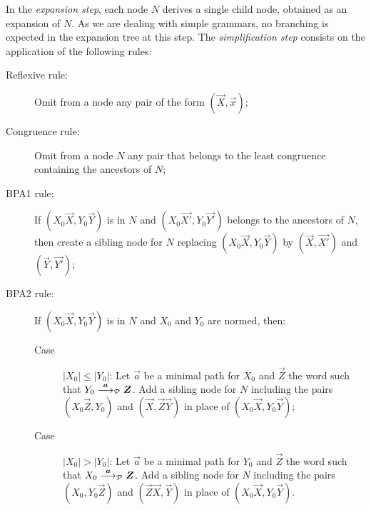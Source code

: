 In the \emph{expansion step}, each node $N$ derives a single child
node, obtained as an expansion of $N$. As we are dealing with simple
grammars, no branching is expected in the expansion tree at this
step.
%
The \emph{simplification step} consists on the application of the
following rules:
%
\begin{description}
\item[Reflexive rule:] Omit from a node any pair of the form $(\vec X,\vec x)$;
\item[Congruence rule:] Omit from a node $N$ any pair that belongs to
  the least congruence containing the ancestors of $N$;
\item[BPA1 rule:] If $(X_0 \vec X, Y_0 \vec Y)$ is in
  $N$ and $(X_0 \vec {X'}, Y_0 \vec {Y'})$ belongs to the ancestors of
  $N$, then create a sibling node for $N$ replacing
  $(X_0 \vec X, Y_0 \vec Y)$ by $(\vec X, \vec {X'})$ and
  $(\vec Y, \vec {Y'})$;
\item[BPA2 rule:] If $(X_0 \vec X, Y_0 \vec Y)$ is in $N$
  and $X_0$ and $Y_0$ are normed, then:
  \begin{description}
  \item[Case] $|X_0| \leq |Y_0|$: Let $\vec a$ be a minimal path
    for $X_0$ and $\vec Z$ the word such that
    $ Y_0 \LTSderivesP[\vec a] \vec Z$. Add a sibling node for
    $N$ including the pairs $(X_0 \vec Z, Y_0)$ and
    $(\vec X, \vec Z \vec Y)$ in place of $(X_0 \vec X, Y_0 \vec Y)$;
  \item[Case] $|X_0| > |Y_0|$: Let $\vec a$ be a minimal path for
    $Y_0$ and $\vec Z$ the word such that
    $ X_0 \LTSderivesP[\vec a] \vec Z$. Add a sibling node for $N$
    including the pairs $(X_0 , Y_0 \vec Z )$ and
    $(\vec Z\vec X, \vec Y)$ in place of $(X_0 \vec X, Y_0 \vec Y)$.
  \end{description}
\end{description}

